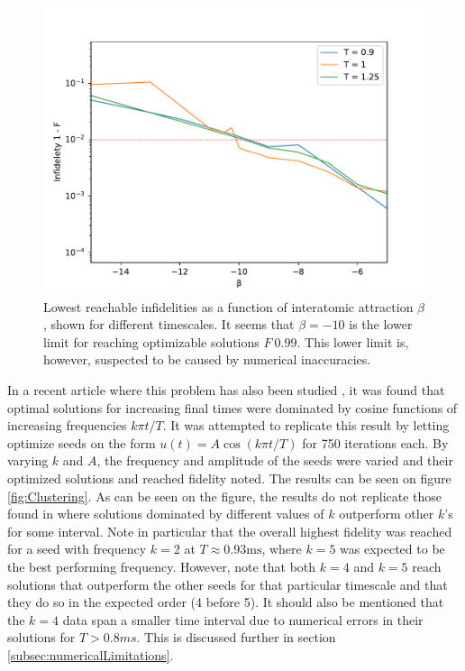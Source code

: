 \documentclass[aps,pra,reprint,superscriptaddress]{revtex4-1}
\begin{document}
\begin{figure}
	\includegraphics[width=\columnwidth]{graphics/reachable_neg_beta.pdf}
	\caption{Lowest reachable infidelities as a function of interatomic attraction $\beta$, shown for different timescales. It seems that $\beta=-10$ is the lower limit for reaching optimizable solutions $F~0.99$. This lower limit is, however, suspected to be caused by numerical inaccuracies.}
	\label{fig:reachable_neg_betas}
\end{figure} 

In a recent article where this problem has also been studied \cite{QM2Paper}, it was found that optimal solutions for increasing final times were dominated by cosine functions of increasing frequencies $k\pi t/T$. It was attempted to replicate this result by letting  optimize seeds on the form $u(t) = A\cos(k\pi t/T)$ for 750 iterations each. By varying $k$ and $A$, the frequency and amplitude of the seeds were varied and their optimized solutions and reached fidelity noted. The results can be seen on figure \ref{fig:Clustering}. As can be seen on the figure, the results do not replicate those found in \cite{QM2Paper} where solutions dominated by different values of $k$ outperform other $k$'s for some interval. Note in particular that the overall highest fidelity was reached for a seed with frequency $k=2$ at $T\approx 0.93 \text{ms}$, where $k=5$ was expected to be the best performing frequency. However, note that both $k=4$ and $k=5$ reach solutions that outperform the other seeds for that particular timescale and that they do so in the expected order (4 before 5). It should also be mentioned that the $k=4$ data span a smaller time interval due to numerical errors in their solutions for $T>0.8 ms$. This is discussed further in section \ref{subsec:numericalLimitations}. \\
\end{document}
